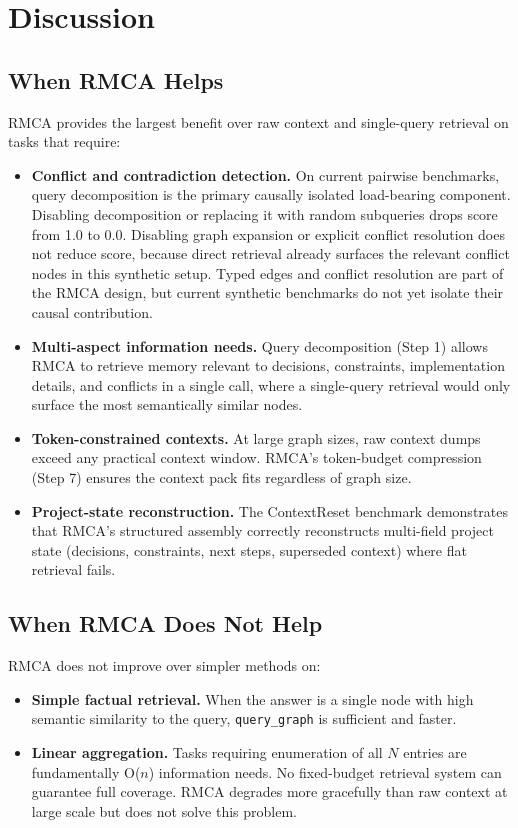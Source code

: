 \documentclass[conference]{IEEEtran}
\begin{document}
\section{Discussion}

\subsection{When RMCA Helps}

RMCA provides the largest benefit over raw context and single-query retrieval on tasks
that require:
\begin{itemize}
\item \textbf{Conflict and contradiction detection.} On current pairwise benchmarks, query decomposition is the primary causally isolated load-bearing component. Disabling decomposition or replacing it with random subqueries drops score from 1.0 to 0.0. Disabling graph expansion or explicit conflict resolution does not reduce score, because direct retrieval already surfaces the relevant conflict nodes in this synthetic setup. Typed edges and conflict resolution are part of the RMCA design, but current synthetic benchmarks do not yet isolate their causal contribution.
\item \textbf{Multi-aspect information needs.} Query decomposition (Step 1) allows RMCA
to retrieve memory relevant to decisions, constraints, implementation details, and conflicts
in a single call, where a single-query retrieval would only surface the most semantically
similar nodes.
\item \textbf{Token-constrained contexts.} At large graph sizes, raw context dumps exceed
any practical context window. RMCA's token-budget compression (Step 7) ensures the context
pack fits regardless of graph size.
\item \textbf{Project-state reconstruction.} The ContextReset benchmark demonstrates that
RMCA's structured assembly correctly reconstructs multi-field project state (decisions,
constraints, next steps, superseded context) where flat retrieval fails.
\end{itemize}

\subsection{When RMCA Does Not Help}

RMCA does not improve over simpler methods on:
\begin{itemize}
\item \textbf{Simple factual retrieval.} When the answer is a single node with high
semantic similarity to the query, \texttt{query\_graph} is sufficient and faster.
\item \textbf{Linear aggregation.} Tasks requiring enumeration of all $N$ entries are
fundamentally O($n$) information needs. No fixed-budget retrieval system can guarantee
full coverage. RMCA degrades more gracefully than raw context at large scale but does not
solve this problem.
\end{itemize}
\end{document}
